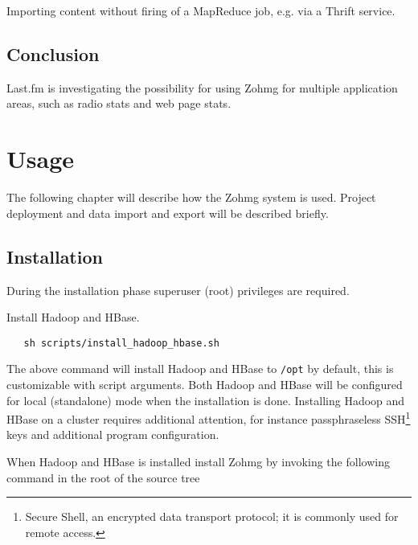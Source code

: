 Importing content without firing of a MapReduce job, e.g. via a Thrift
service.



\section{Conclusion}

Last.fm is investigating the possibility for using Zohmg for multiple
application areas, such as radio stats and web page stats.


\pagebreak



 



\appendix



\chapter{Usage}


\noindent The following chapter will describe how the Zohmg system is used.
Project deployment and data import and export will be described briefly.


\section{Installation}

During the installation phase superuser (root) privileges are required.

Install Hadoop and HBase.

\begin{verbatim}
   sh scripts/install_hadoop_hbase.sh
\end{verbatim}

The above command will install Hadoop and HBase to \texttt{/opt} by default,
this is customizable with script arguments. Both Hadoop and HBase will be
configured for local (standalone) mode when the installation is done. Installing
Hadoop and HBase on a cluster requires additional attention, for
instance passphraseless SSH\footnote{Secure Shell, an encrypted data transport
protocol; it is commonly used for remote access.} keys and additional program
configuration.

When Hadoop and HBase is installed install Zohmg by invoking the following
command in the root of the source tree

